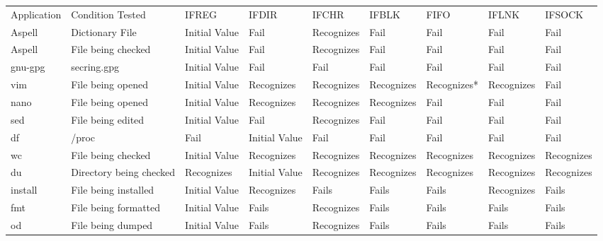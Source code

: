 \begin{table}[t]
    \scriptsize{}
    \begin{tabular}{l  l  |  l  l  l  l  l  l  l}
    \toprule{}
        Application & Condition Tested           & IFREG        & IFDIR        & IFCHR     & IFBLK    & FIFO      & IFLNK    & IFSOCK\\
        Aspell      & Dictionary File            & Initial Value  & Fail           & Recognizes  & Fail       & Fail        & Fail       & Fail\\
        Aspell      & File being checked         & Initial Value  & Fail           & Recognizes  & Fail       & Fail        & Fail       & Fail\\
        gnu-gpg     & secring.gpg                & Initial Value  & Fail           & Fail        & Fail       & Fail        & Fail       & Fail\\
        vim         & File being opened          & Initial Value  & Recognizes     & Recognizes  & Recognizes & Recognizes* & Recognizes & Fail\\
        nano        & File being opened          & Initial Value  & Recognizes     & Recognizes  & Recognizes & Fail        & Fail       & Fail\\
        sed         & File being edited          & Initial Value  & Fail           & Recognizes  & Fail       & Fail        & Fail       & Fail\\
        df          & /proc                      & Fail           & Initial Value  & Fail        & Fail       & Fail        & Fail       & Fail\\
        wc          & File being checked         & Initial Value  & Recognizes     & Recognizes  & Recognizes & Recognizes  & Recognizes & Recognizes\\
        du          & Directory being checked    & Recognizes     & Initial Value  & Recognizes  & Recognizes & Recognizes  & Recognizes & Recognizes\\
        install     & File being installed       & Initial Value  & Recognizes     & Fails       & Fails      & Fails       & Recognizes & Fails\\
        fmt         & File being formatted       & Initial Value  & Fails          & Recognizes  & Fails      & Fails       & Fails      & Fails\\
        od          & File being dumped          & Initial Value  & Fails          & Recognizes  & Fails      & Fails       & Fails      & Fails\\

\end{tabular}
\end{table}

